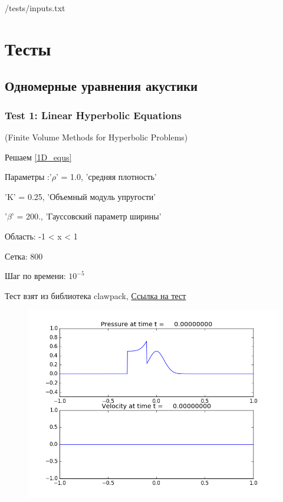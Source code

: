 \documentclass{article}
\begin{document}
/tests/inputs.txt

\section{Тесты}
\subsection{Одномерные уравнения акустики}


 
 
\subsubsection{Test 1: Linear Hyperbolic Equations}

(Finite Volume Methods for Hyperbolic Problems)

Решаем \ref{1D_equs}

Параметры :'$\rho$' = 1.0,  'средняя плотность'

             'K' = 0.25,  'Объемный модуль упругости'
             
             '$\beta$' = 200.,  'Гауссовский параметр ширины'
             
Область: -1 < x < 1
     
Сетка: 800
 
Шаг по времени: $10^{-5}$
 
  Тест взят из библиотека clawpack, \cite{clawpack}
  \href{http://www.clawpack.org/gallery/_static/apps/fvmbook/chap3/acousimple/README.html}{Ссылка на тест}
 
 \begin{figure}[h]
  \begin{center}
    \includegraphics[scale=0.5]{1D_acoustic_test/TEST1/frame0000fig1.png}
  \end{center}
\end{figure}
 
\end{document}
